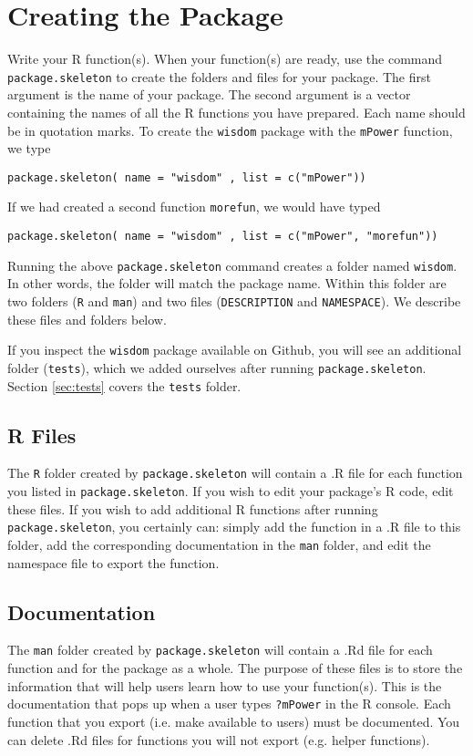 \documentclass{article}
\begin{document}
\section{Creating the Package}
Write your R function(s). When your function(s) are ready, use the command \texttt{package.skeleton} to create the folders and files for your package. The first argument is  the name of your package. The second argument is a vector containing the names of all the R functions you have prepared. Each name should be in quotation marks. To create the \texttt{wisdom} package with the \texttt{mPower} function, we type
\begin{verbatim}
package.skeleton( name = "wisdom" , list = c("mPower"))
\end{verbatim}
If we had created a second function \texttt{morefun}, we would have typed
\begin{verbatim}
package.skeleton( name = "wisdom" , list = c("mPower", "morefun"))
\end{verbatim}
Running the above \texttt{package.skeleton} command  creates a folder named \texttt{wisdom}. In other words, the folder will match the package name.
Within this folder are two folders (\texttt{R} and \texttt{man}) and two files (\texttt{DESCRIPTION} and \texttt{NAMESPACE}). We describe these files and folders below.

If you inspect the \texttt{wisdom} package available on Github, you will see an additional folder (\texttt{tests}), which we added ourselves after running  \texttt{package.skeleton}. Section \ref{sec:tests} covers the \texttt{tests} folder.

\subsection{R Files} 
The \texttt{R} folder created by  \texttt{package.skeleton} will contain a .R file for each function you listed in   \texttt{package.skeleton}. If you wish to edit your package's R code, edit these files. If you wish to add additional R functions after running  \texttt{package.skeleton}, you certainly can: simply add the function in a .R file to this folder, add the corresponding documentation in the \texttt{man} folder, and edit the namespace file to export the function.

\subsection{Documentation}
The \texttt{man} folder created by  \texttt{package.skeleton} will contain a .Rd file for each function and for the package as a whole.  The purpose of these files is to store the information that will help users learn how to use your function(s). This is the documentation that pops up when a user types \texttt{?mPower} in the R console. Each function that you export (i.e. make available to users) must be documented. You can delete .Rd files for functions you will not export (e.g. helper functions).  \\
\end{document}
